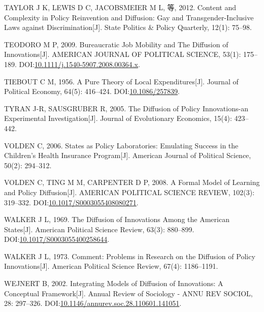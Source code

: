 \documentclass[
  12pt,
]{ctexart}
\newlength{\cslhangindent}
\newlength{\cslentryspacingunit} %
\newenvironment{CSLReferences}[2] %
 {%
  \setlength{\parindent}{0pt}
  \ifodd #1
  \let\oldpar\par
  \def\par{\hangindent=\cslhangindent\oldpar}
  \fi
  \setlength{\parskip}{#2\cslentryspacingunit}
 }%
 {}
\begin{document}
\begin{CSLReferences}{1}{0}
\leavevmode{}%
TAYLOR J K, LEWIS D C, JACOBSMEIER M L, 等, 2012. Content and Complexity in Policy Reinvention and Diffusion: {Gay} and Transgender-Inclusive Laws against Discrimination{[}J{]}. State Politics \& Policy Quarterly, 12(1): 75--98.

\leavevmode{}%
TEODORO M P, 2009. Bureaucratic {Job Mobility} and {The Diffusion} of {Innovations}{[}J{]}. AMERICAN JOURNAL OF POLITICAL SCIENCE, 53(1): 175--189. DOI:\href{https://doi.org/10.1111/j.1540-5907.2008.00364.x}{10.1111/j.1540-5907.2008.00364.x}.

\leavevmode{}%
TIEBOUT C M, 1956. A {Pure Theory} of {Local Expenditures}{[}J{]}. Journal of Political Economy, 64(5): 416--424. DOI:\href{https://doi.org/10.1086/257839}{10.1086/257839}.

\leavevmode{}%
TYRAN J-R, SAUSGRUBER R, 2005. The Diffusion of Policy Innovations-an Experimental Investigation{[}J{]}. Journal of Evolutionary Economics, 15(4): 423--442.

\leavevmode{}%
VOLDEN C, 2006. States as {Policy Laboratories}: {Emulating Success} in the {Children}'s {Health Insurance Program}{[}J{]}. American Journal of Political Science, 50(2): 294--312.

\leavevmode{}%
VOLDEN C, TING M M, CARPENTER D P, 2008. A Formal Model of Learning and Policy Diffusion{[}J{]}. AMERICAN POLITICAL SCIENCE REVIEW, 102(3): 319--332. DOI:\href{https://doi.org/10.1017/S0003055408080271}{10.1017/S0003055408080271}.

\leavevmode{}%
WALKER J L, 1969. The {Diffusion} of {Innovations} Among the {American States}{[}J{]}. American Political Science Review, 63(3): 880--899. DOI:\href{https://doi.org/10.1017/S0003055400258644}{10.1017/S0003055400258644}.

\leavevmode{}%
WALKER J L, 1973. Comment: {Problems} in Research on the Diffusion of Policy Innovations{[}J{]}. American Political Science Review, 67(4): 1186--1191.

\leavevmode{}%
WEJNERT B, 2002. Integrating {Models} of {Diffusion} of {Innovations}: {A Conceptual Framework}{[}J{]}. Annual Review of Sociology - ANNU REV SOCIOL, 28: 297--326. DOI:\href{https://doi.org/10.1146/annurev.soc.28.110601.141051}{10.1146/annurev.soc.28.110601.141051}.


\end{CSLReferences}
\end{document}
